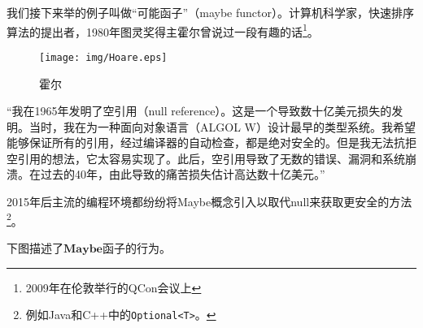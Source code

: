 \documentclass{article}
\begin{document}
\begin{example}
我们接下来举的例子叫做“可能函子”（maybe functor）。计算机科学家，快速排序算法的提出者，1980年图灵奖得主霍尔曾说过一段有趣的话\footnote{2009年在伦敦举行的QCon会议上}。

\begin{figure}[h!]
 \centering
 \texttt{[image: img/Hoare.eps]}
 \captionsetup{labelformat=empty}
 \caption{霍尔}
 \label{fig:Hoare}
\end{figure}

“我在1965年发明了空引用（null reference）。这是一个导致数十亿美元损失的发明。当时，我在为一种面向对象语言（ALGOL W）设计最早的类型系统。我希望能够保证所有的引用，经过编译器的自动检查，都是绝对安全的。但是我无法抗拒空引用的想法，它太容易实现了。此后，空引用导致了无数的错误、漏洞和系统崩溃。在过去的40年，由此导致的痛苦损失估计高达数十亿美元。”\cite{Wiki-Hoare}


2015年后主流的编程环境都纷纷将Maybe概念引入以取代null来获取更安全的方法\footnote{例如Java和C++中的\texttt{Optional<T>}。}。

下图描述了$\mathbf{Maybe}$函子的行为。

\begin{center}
\end{center}


\end{example}
\end{document}
